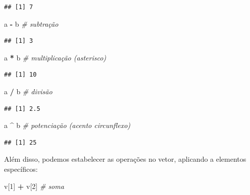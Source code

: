 \documentclass[
]{book}
\newenvironment{Shaded}{\begin{snugshade}}{\end{snugshade}}
\newcommand{\CommentTok}[1]{\textcolor[rgb]{0.56,0.35,0.01}{\textit{#1}}}
\newcommand{\DecValTok}[1]{\textcolor[rgb]{0.00,0.00,0.81}{#1}}
\newcommand{\NormalTok}[1]{#1}
\newcommand{\OperatorTok}[1]{\textcolor[rgb]{0.81,0.36,0.00}{\textbf{#1}}}
\newcommand{\StringTok}[1]{\textcolor[rgb]{0.31,0.60,0.02}{#1}}
\begin{document}
\begin{verbatim}
## [1] 7
\end{verbatim}

\begin{Shaded}
\begin{Highlighting}[]
\NormalTok{a }\OperatorTok{-}\StringTok{ }\NormalTok{b }\CommentTok{# subtração}
\end{Highlighting}
\end{Shaded}

\begin{verbatim}
## [1] 3
\end{verbatim}

\begin{Shaded}
\begin{Highlighting}[]
\NormalTok{a }\OperatorTok{*}\StringTok{ }\NormalTok{b }\CommentTok{# multiplicação (asterisco)}
\end{Highlighting}
\end{Shaded}

\begin{verbatim}
## [1] 10
\end{verbatim}

\begin{Shaded}
\begin{Highlighting}[]
\NormalTok{a }\OperatorTok{/}\StringTok{ }\NormalTok{b }\CommentTok{# divisão}
\end{Highlighting}
\end{Shaded}

\begin{verbatim}
## [1] 2.5
\end{verbatim}

\begin{Shaded}
\begin{Highlighting}[]
\NormalTok{a }\OperatorTok{^}\StringTok{ }\NormalTok{b }\CommentTok{# potenciação (acento circunflexo)}
\end{Highlighting}
\end{Shaded}

\begin{verbatim}
## [1] 25
\end{verbatim}

Além disso, podemos estabelecer as operações no vetor, aplicando a elementos específicos:

\begin{Shaded}
\begin{Highlighting}[]
\NormalTok{v[}\DecValTok{1}\NormalTok{] }\OperatorTok{+}\StringTok{ }\NormalTok{v[}\DecValTok{2}\NormalTok{] }\CommentTok{# soma}
\end{Highlighting}
\end{Shaded}
\end{document}
